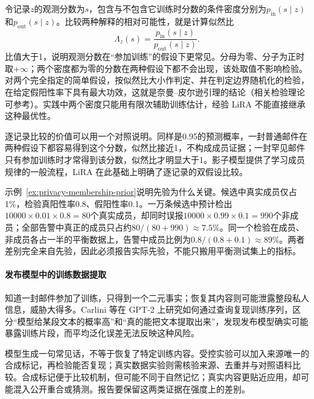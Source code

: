 令记录$z$的观测分数为$s$，包含与不包含它训练时分数的条件密度分别为$p_{\mathrm{in}}(s\mid z)$和$p_{\mathrm{out}}(s\mid z)$。比较两种解释的相对可能性，就是计算似然比
\begin{equation}
 \Lambda_z(s)=
 \frac{p_{\mathrm{in}}(s\mid z)}
      {p_{\mathrm{out}}(s\mid z)}.
 \label{eq:privacy-membership-likelihood}
\end{equation}
比值大于1，说明观测分数在“参加训练”的假设下更常见。分母为零、分子为正时取$+\infty$；两个密度都为零的分数在两种假设下都不会出现，该处取值不影响检验。对两个完全指定的简单假设，按似然比大小作判定、并在判定边界随机化的检验，在给定假阳性率下具有最大功效，这就是奈曼--皮尔逊引理的结论（相关检验理论可参考）。实践中两个密度只能用有限次辅助训练估计，经验 LiRA 不能直接继承这种最优性。

逐记录比较的价值可以用一个对照说明。同样是0.95的预测概率，一封普通邮件在两种假设下都容易得到这个分数，似然比接近1，不构成成员证据；一封罕见邮件只有参加训练时才常得到该分数，似然比才明显大于1。影子模型提供了学习成员规律的一般流程，LiRA 在此基础上明确了逐记录的双假设比较。

\begin{example}[成员先验改变结果的含义]
\label{ex:privacy-membership-prior}
示例~\ref{ex:privacy-membership-prior}说明先验为什么关键。候选中真实成员仅占1\%，检验真阳性率0.8、假阳性率0.1。一万条候选中预计检出$10000\times0.01\times0.8=80$个真实成员，却同时误报$10000\times0.99\times0.1=990$个非成员；全部告警中真正的成员只占约$80/(80+990)\approx7.5\%$。同一个检验在成员、非成员各占一半的平衡数据上，告警中成员比例为$0.8/(0.8+0.1)\approx89\%$。两者差别完全来自先验，因此必须报告实际先验，不能只搬用平衡测试集上的指标。
\end{example}

\paragraph{发布模型中的训练数据提取}

知道一封邮件参加了训练，只得到一个二元事实；恢复其内容则可能泄露整段私人信息，威胁大得多。Carlini 等在 GPT-2 上研究如何通过查询复现训练序列，区分“模型给某段文本的概率高”和“真的能把文本提取出来”，发现发布模型确实可能暴露训练片段，而平均泛化误差无法反映这种风险。

模型生成一句常见话，不等于恢复了特定训练内容。受控实验可以加入来源唯一的合成标记，再检验能否复现；真实数据实验则需核验来源、去重并与对照语料比较。合成标记便于比较机制，但可能不同于自然记忆；真实内容更贴近应用，却可能混入公开重合或猜测。报告要保留这两类证据在强度上的差别。

